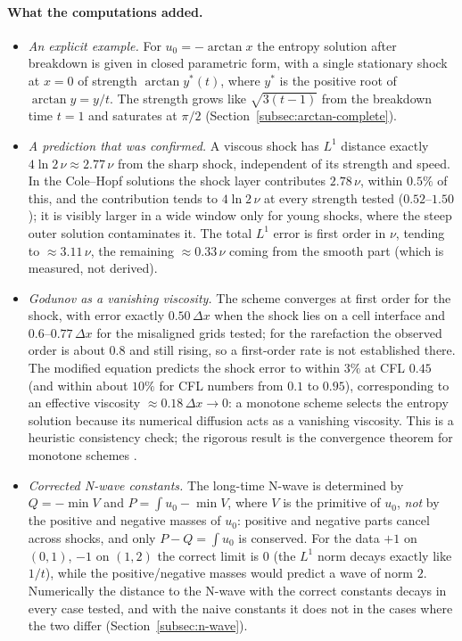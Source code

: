 \paragraph{What the computations added.}
\begin{itemize}
  \item \emph{An explicit example.} For $u_0=-\arctan x$ the entropy solution
    after breakdown is given in closed parametric form, with a single
    stationary shock at $x=0$ of strength $\arctan y^*(t)$, where $y^*$ is
    the positive root of $\arctan y=y/t$. The strength grows like
    $\sqrt{3(t-1)}$ from the breakdown time $t=1$ and saturates at $\pi/2$
    (Section~\ref{subsec:arctan-complete}).
  \item \emph{A prediction that was confirmed.} A viscous shock has $L^1$
    distance exactly $4\ln2\,\nu\approx2.77\,\nu$ from the sharp shock,
    independent of its strength and speed. In the Cole--Hopf solutions the
    shock layer contributes $2.78\,\nu$, within $0.5\%$ of this, and the
    contribution tends to $4\ln2\,\nu$ at every strength tested
    ($0.52$--$1.50$); it is visibly larger in a wide window only for young
    shocks, where the steep outer solution contaminates it. The total
    $L^1$ error is first order in $\nu$, tending to $\approx3.11\,\nu$,
    the remaining $\approx0.33\,\nu$ coming from the smooth part (which is
    measured, not derived).
  \item \emph{Godunov as a vanishing viscosity.} The scheme converges at
    first order for the shock, with error exactly $0.50\,\Delta x$ when the
    shock lies on a cell interface and $0.6$--$0.77\,\Delta x$ for the misaligned grids tested;
    for the rarefaction the observed order is about $0.8$ and still rising,
    so a first-order rate is not established there. The modified equation
    predicts the shock error to within $3\%$ at CFL $0.45$ (and within about
    $10\%$ for CFL numbers from $0.1$ to $0.95$), corresponding to an
    effective viscosity $\approx0.18\,\Delta x\to0$: a monotone scheme
    selects the entropy solution because its numerical diffusion acts as a
    vanishing viscosity. This is a heuristic consistency check; the rigorous
    result is the convergence theorem for monotone schemes
    \cite{crandall1980}.
  \item \emph{Corrected N-wave constants.} The long-time N-wave is
    determined by $Q=-\min V$ and $P=\int u_0-\min V$, where $V$ is the
    primitive of $u_0$, \emph{not} by the positive and negative masses of
    $u_0$: positive and negative parts cancel across shocks, and only
    $P-Q=\int u_0$ is conserved. For the data $+1$ on $(0,1)$, $-1$ on
    $(1,2)$ the correct limit is $0$ (the $L^1$ norm decays exactly like
    $1/t$), while the positive/negative masses would predict a wave of
    norm $2$. Numerically the distance to the N-wave with the correct
    constants decays in every case tested, and with the naive constants it
    does not in the cases where the two differ (Section~\ref{subsec:n-wave}).
\end{itemize}

